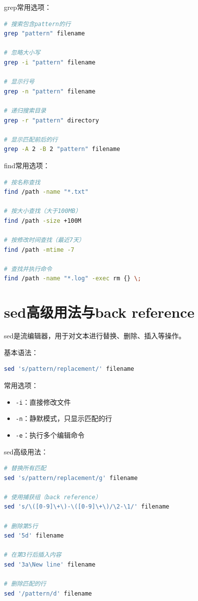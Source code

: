 \documentclass[12pt,UTF8]{ctexbook}
\begin{document}
grep常用选项：
\begin{lstlisting}[language=bash]
# 搜索包含pattern的行
grep "pattern" filename

# 忽略大小写
grep -i "pattern" filename

# 显示行号
grep -n "pattern" filename

# 递归搜索目录
grep -r "pattern" directory

# 显示匹配前后的行
grep -A 2 -B 2 "pattern" filename
\end{lstlisting}

find常用选项：
\begin{lstlisting}[language=bash]
# 按名称查找
find /path -name "*.txt"

# 按大小查找（大于100MB）
find /path -size +100M

# 按修改时间查找（最近7天）
find /path -mtime -7

# 查找并执行命令
find /path -name "*.log" -exec rm {} \;
\end{lstlisting}

\section{sed高级用法与back reference}
\label{sec:sed-advanced}

sed是流编辑器，用于对文本进行替换、删除、插入等操作。

基本语法：
\begin{lstlisting}[language=bash]
sed 's/pattern/replacement/' filename
\end{lstlisting}

常用选项：
\begin{itemize}
    \item \texttt{-i}：直接修改文件
    \item \texttt{-n}：静默模式，只显示匹配的行
    \item \texttt{-e}：执行多个编辑命令
\end{itemize}

sed高级用法：
\begin{lstlisting}[language=bash]
# 替换所有匹配
sed 's/pattern/replacement/g' filename

# 使用捕获组（back reference）
sed 's/\([0-9]\+\)-\([0-9]\+\)/\2-\1/' filename

# 删除第5行
sed '5d' filename

# 在第3行后插入内容
sed '3a\New line' filename

# 删除匹配的行
sed '/pattern/d' filename
\end{lstlisting}
\end{document}
